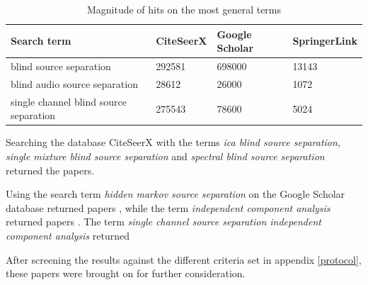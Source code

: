 \documentclass[11pt, oneside, a4paper]{report}
\begin{document}
\begin{table}[h]
\centering
	\begin{tabular}{|l|l|l|l|}
	\hline
	\textbf{Search term} & \textbf{CiteSeerX} & \textbf{Google Scholar} & \textbf{SpringerLink} \\
	\hline
	blind source separation & 292581 & 698000 & 13143\\
	blind audio source separation & 28612 & 26000 & 1072\\
	single channel blind source separation & 275543 & 78600 & 5024\\
	\hline
	\end{tabular}
\caption{Magnitude of hits on the most general terms}
\label{tab:myfirsttable}
\end{table}

Searching the database CiteSeerX with the terms \emph{ica blind source separation}, \emph{single mixture blind source separation} and \emph{spectral blind source separation} returned the papers\cite{bellSejnowski95}\cite{hyvarinen2001}. 

Using the search term \emph{hidden markov source separation} on the Google Scholar database returned papers \cite{roweisOneMic} \cite{VargaHMMDecomp}, while the term \emph{independent component analysis} returned papers\cite{comon94} \cite{fastICA}. The term \emph{single channel source separation independent component analysis} returned \cite{davies2007}



After screening the results against the different criteria set in appendix \ref{protocol}, these papers were brought on for further consideration.
\end{document}
